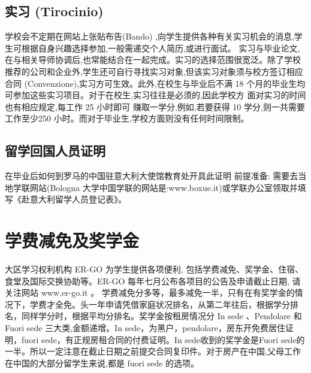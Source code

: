 \subsection{实习 (Tirocinio)}
学校会不定期在网站上张贴布告(Bando) ,向学生提供各种有关实习机会的消息,学生可根据自身兴趣选择参加,一般需递交个人简历,或进行面试。 实习与毕业论文,在与相关导师协调后,也常能结合在一起完成。实习的选择范围很宽泛。除了学校推荐的公司和企业外,学生还可自行寻找实习对象,但该实习对象须与校方签订相应合同 (Convenzione),实习方可生效。此外,在校生与毕业后不满 18 个月的毕业生均可参加这些实习项目。对于在校生,实习往往是必须的,因此学校方 面对实习的时间也有相应规定,每工作 25 小时即可 
赚取一学分,例如,若要获得 10 学分,则一共需要工作至少250 小时。而对于毕业生,学校方面则没有任何时间限制。 
\subsection{留学回国人员证明}
在毕业后如何到罗马的中国驻意大利大使馆教育处开具此证明 
前提准备: 需要去当地学联网站(Bologna 大学中国学联的网站是:www.boxue.it)或学联办公室领取并填写《赴意大利留学人员登记表》。

\section{学费减免及奖学金}

大区学习权利机构 ER-GO 为学生提供各项便利, 包括学费减免、奖学金、住宿、食堂及国际交换协助等。ER-GO 每年七月公布各项目的公告及申请截止日期, 请关注网站 www.er-go.it 。 
学费减免分多等，最多减免一半，只有在有奖学金的情况下，学费才全免。头一年申请凭借家庭状况排名，从第二年往后，根据学分排名，同样学分时，根据平均分排名。奖学金按租房情况分 In sede 、Pendolare 和 Fuori sede 三大类,金额递增。In sede，为黑户，pendolare，房东开免费居住证明，fuori sede，有正规房租合同的付费证明。In sede收到的奖学金是Fuori sede的一半。所以一定注意在截止日期之前提交合同复印件。对于房产在中国,父母工作在中国的大部分留学生来说,都是 fuori sede 的选项。

